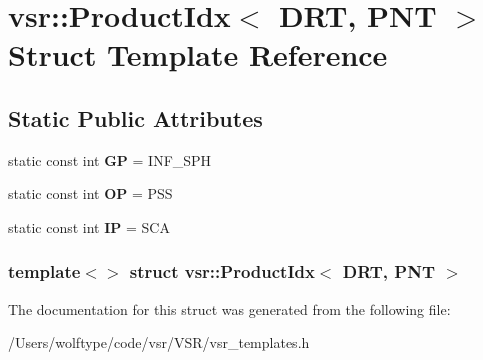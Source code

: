 \hypertarget{structvsr_1_1_product_idx_3_01_d_r_t_00_01_p_n_t_01_4}{\section{vsr\-:\-:Product\-Idx$<$ D\-R\-T, P\-N\-T $>$ Struct Template Reference}
\label{structvsr_1_1_product_idx_3_01_d_r_t_00_01_p_n_t_01_4}
}
\subsection*{Static Public Attributes}
\begin{DoxyCompactItemize}
\item 
\hypertarget{structvsr_1_1_product_idx_3_01_d_r_t_00_01_p_n_t_01_4_a7ba5132928bc8eb4a871774a75d1bfc5}{static const int {\bfseries G\-P} = I\-N\-F\-\_\-\-S\-P\-H}\label{structvsr_1_1_product_idx_3_01_d_r_t_00_01_p_n_t_01_4_a7ba5132928bc8eb4a871774a75d1bfc5}

\item 
\hypertarget{structvsr_1_1_product_idx_3_01_d_r_t_00_01_p_n_t_01_4_acf1e9ada5a9a23391f5ad558dd7d6a93}{static const int {\bfseries O\-P} = P\-S\-S}\label{structvsr_1_1_product_idx_3_01_d_r_t_00_01_p_n_t_01_4_acf1e9ada5a9a23391f5ad558dd7d6a93}

\item 
\hypertarget{structvsr_1_1_product_idx_3_01_d_r_t_00_01_p_n_t_01_4_ac1d7c4e3e0207232a9abf2419bfad959}{static const int {\bfseries I\-P} = S\-C\-A}\label{structvsr_1_1_product_idx_3_01_d_r_t_00_01_p_n_t_01_4_ac1d7c4e3e0207232a9abf2419bfad959}

\end{DoxyCompactItemize}
\subsubsection*{template$<$$>$ struct vsr\-::\-Product\-Idx$<$ D\-R\-T, P\-N\-T $>$}



The documentation for this struct was generated from the following file\-:\begin{DoxyCompactItemize}
\item 
/\-Users/wolftype/code/vsr/\-V\-S\-R/vsr\-\_\-templates.\-h\end{DoxyCompactItemize}
